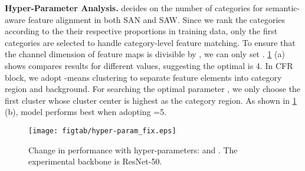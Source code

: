 \documentclass[10pt,twocolumn,letterpaper]{article}
\begin{document}
\textbf{Hyper-Parameter Analysis.\label{sec: hyper-param}}  decides on the number of categories for semantic-aware feature alignment in both SAN and SAW. Since we rank the categories according to the their respective proportions in training data, only the first  categories are selected to handle category-level feature matching. To ensure that the channel dimension of feature maps is divisible by , we can only set . \cref{fig6} (a) shows compares results for different values, suggesting the optimal  is 4. In CFR block, we adopt -means clustering to separate feature elements into category region and background. For searching the optimal parameter , we only choose the first cluster whose cluster center is highest as the category region. As shown in \cref{fig6} (b), model performs best when adopting =5.
\vspace{-2.75mm}


\begin{figure}[t]
    \centering{}\vspace{0mm}
     \texttt{[image: figtab/hyper-param\_fix.eps]} 
     \vspace{-6mm}
     \caption{Change in performance with hyper-parameters:  and . The experimental backbone is ResNet-50.
     }
    \label{fig6}\vspace{-5mm}
    
    \end{figure}






\begin{table}[t]
\caption{Comparison of different methods for performance drop on source domain. The performance drop () is obtained with respect to the baseline. The best and second best values are \textbf{highlighted} and \underline{underlined}, respectively. The network backbone is ResNet-50.\label{Tab: source decay}}
\vspace{-2mm}
\centering{}
\vspace{-2mm}
\end{table}
\end{document}
